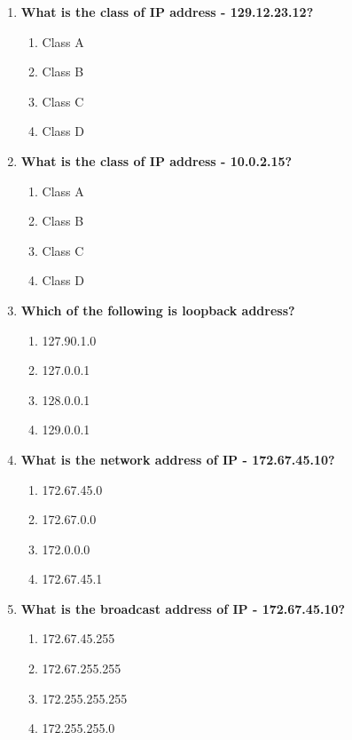\begin{flushleft}
\begin{enumerate}
		\item \textbf{What is the class of IP address - 129.12.23.12?}
		\begin{enumerate}[label=(\alph*)]
			\item Class A
			\item Class B  %
			\item Class C  
			\item Class D
		\end{enumerate}
		\bigskip
		\bigskip

		\item \textbf{What is the class of IP address - 10.0.2.15?}
		\begin{enumerate}[label=(\alph*)]
			\item Class A  %
			\item Class B  
			\item Class C  
			\item Class D
		\end{enumerate}
		\bigskip
		\bigskip

		\item \textbf{Which of the following is loopback address?}
		\begin{enumerate}[label=(\alph*)]
			\item 127.90.1.0
			\item 127.0.0.1   %
			\item 128.0.0.1
			\item 129.0.0.1
		\end{enumerate}
		\bigskip
		\bigskip
		
		\item \textbf{What is the network address of IP - 172.67.45.10?}
		\begin{enumerate}[label=(\alph*)]
			\item 172.67.45.0
			\item 172.67.0.0 %
			\item 172.0.0.0
			\item 172.67.45.1
		\end{enumerate}
		\bigskip
		\bigskip

		\item \textbf{What is the broadcast address of IP - 172.67.45.10?}
		\begin{enumerate}[label=(\alph*)]
			\item 172.67.45.255
			\item 172.67.255.255 %
			\item 172.255.255.255
			\item 172.255.255.0
		\end{enumerate}
		\bigskip
		\bigskip		
		

\end{enumerate}
\end{flushleft}
